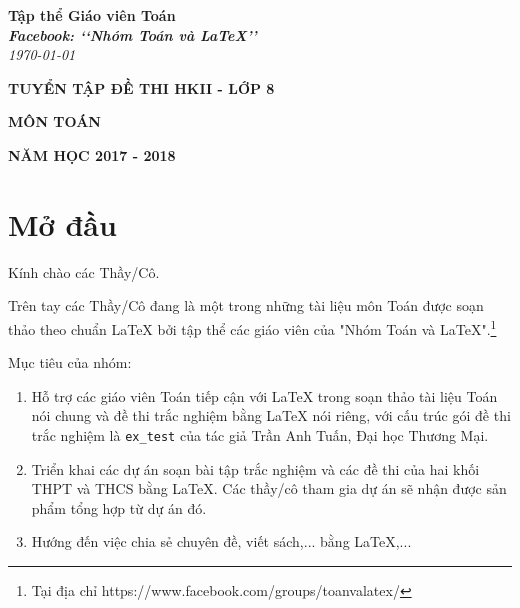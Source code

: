 \documentclass[12pt,a4paper,oneside]{book}
\renewcommand{\baselinestretch}{1.4}
\begin{document}
\providecommand*{\dx}{\ensuremath{\mathrm{\,d}}x}
\providecommand*{\unit}[1]{\ensuremath{\mathrm{\,#1}}}

\begin{titlepage}
\begin{flushright}
\fontsize{17}{0}\selectfont
\textbf{Tập thể Giáo viên Toán}\\
\textbf{\textit{Facebook: \lq\lq Nhóm Toán và LaTeX\rq\rq}}\\
\textit{\color{red}\today}
\end{flushright}

\vspace{4cm}

\begin{flushright}

\vspace{1cm}

 \textbf{\fontsize{20}{0}\selectfont T\fontsize{15}{0}\selectfont UYỂN TẬP ĐỀ THI HKII - LỚP 8}
 
 \vspace{1cm}
 
 \textbf{\fontsize{35}{0}\selectfont MÔN TOÁN}
\end{flushright}

\vfill{
\begin{flushright}
\fontsize{17}{0}\textbf{NĂM HỌC 2017 - 2018}
\end{flushright}
}
\end{titlepage}
\pagestyle{empty}
\renewcommand{\headrulewidth}{0.4pt}

{\renewcommand{\baselinestretch}{1.3}
\tableofcontents
}

\pagestyle{fancy}
\lhead{\empty}
\rhead{\empty}
\lfoot{\currfilename}
\chapter*{Mở đầu}
Kính chào các Thầy/Cô.

\vspace{0.6cm}

\noindent Trên tay các Thầy/Cô đang là một trong những tài liệu môn Toán được soạn thảo theo chuẩn \LaTeX{} bởi tập thể các giáo viên của "Nhóm Toán và LaTeX".\footnote{Tại địa chỉ https://www.facebook.com/groups/toanvalatex/}

\vspace{0.6cm}

\noindent Mục tiêu của nhóm: 
\begin{enumerate}
\item Hỗ trợ các giáo viên Toán tiếp cận với \LaTeX{} trong soạn thảo tài liệu Toán nói chung và đề thi trắc nghiệm bằng \LaTeX{} nói riêng, với cấu trúc gói đề thi trắc nghiệm là \texttt{ex\_test} của tác giả Trần Anh Tuấn, Đại học Thương Mại.
\item Triển khai các dự án soạn bài tập trắc nghiệm và các đề thi của hai khối THPT và THCS bằng \LaTeX{}. Các thầy/cô tham gia dự án sẽ nhận được sản phẩm tổng hợp từ dự án đó.
\item Hướng đến việc chia sẻ chuyên đề, viết sách,... bằng \LaTeX,...
\end{enumerate}
\end{document}
